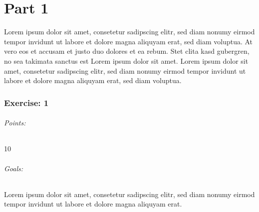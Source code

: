 




\part*{Part 1}
Lorem ipsum dolor sit amet, consetetur sadipscing elitr, sed diam nonumy eirmod tempor invidunt ut labore et dolore magna aliquyam erat, sed diam voluptua. At vero eos et accusam et justo duo dolores et ea rebum. Stet clita kasd gubergren, no sea takimata sanctus est Lorem ipsum dolor sit amet. Lorem ipsum dolor sit amet, consetetur sadipscing elitr, sed diam nonumy eirmod tempor invidunt ut labore et dolore magna aliquyam erat, sed diam voluptua.

\section{Exercise: 1}
\paragraph{Points:} 10
\paragraph{Goals:}
Lorem ipsum dolor sit amet, consetetur sadipscing elitr, sed diam nonumy eirmod tempor invidunt ut labore et dolore magna aliquyam erat.



